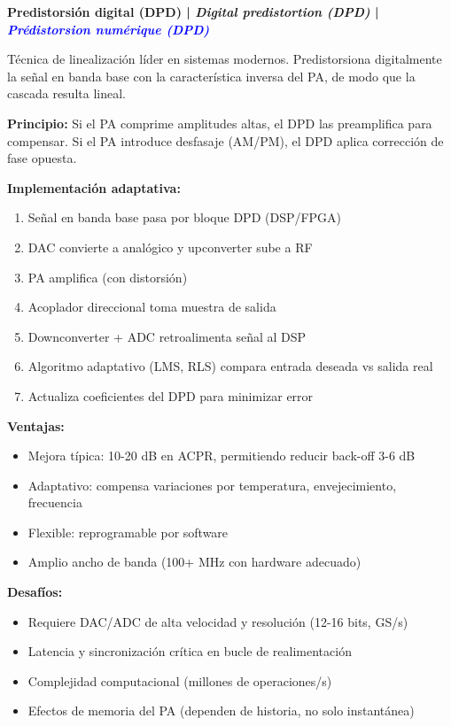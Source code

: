\documentclass[a4paper,10pt]{article}
\begin{document}
\textbf{Predistorsi\'on digital (DPD) | \textit{Digital predistortion (DPD)} | \textcolor{blue}{\textit{Pr\'edistorsion num\'erique (DPD)}}}

T\'ecnica de linealizaci\'on l\'ider en sistemas modernos. Predistorsiona digitalmente la se\~nal en banda base con la caracter\'istica inversa del PA, de modo que la cascada resulta lineal.

\textbf{Principio:} Si el PA comprime amplitudes altas, el DPD las preamplifica para compensar. Si el PA introduce desfasaje (AM/PM), el DPD aplica correcci\'on de fase opuesta.

\textbf{Implementaci\'on adaptativa:}
\begin{enumerate}
    \item Se\~nal en banda base pasa por bloque DPD (DSP/FPGA)
    \item DAC convierte a anal\'ogico y upconverter sube a RF
    \item PA amplifica (con distorsi\'on)
    \item Acoplador direccional toma muestra de salida
    \item Downconverter + ADC retroalimenta se\~nal al DSP
    \item Algoritmo adaptativo (LMS, RLS) compara entrada deseada vs salida real
    \item Actualiza coeficientes del DPD para minimizar error
\end{enumerate}

\textbf{Ventajas:}
\begin{itemize}[leftmargin=*]
    \item Mejora t\'ipica: 10-20 dB en ACPR, permitiendo reducir back-off 3-6 dB
    \item Adaptativo: compensa variaciones por temperatura, envejecimiento, frecuencia
    \item Flexible: reprogramable por software
    \item Amplio ancho de banda (100+ MHz con hardware adecuado)
\end{itemize}

\textbf{Desaf\'ios:}
\begin{itemize}[leftmargin=*]
    \item Requiere DAC/ADC de alta velocidad y resoluci\'on (12-16 bits, GS/s)
    \item Latencia y sincronizaci\'on cr\'itica en bucle de realimentaci\'on
    \item Complejidad computacional (millones de operaciones/s)
    \item Efectos de memoria del PA (dependen de historia, no solo instant\'anea)
\end{itemize}
\end{document}

